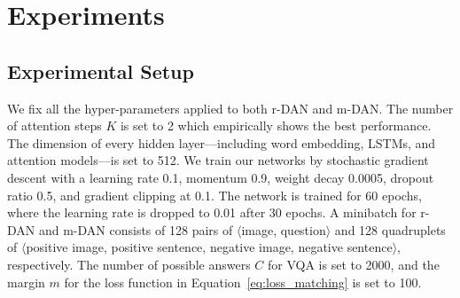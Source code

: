 \documentclass[10pt,twocolumn,letterpaper]{article}
\begin{document}
\section{Experiments}


\subsection{Experimental Setup}
We fix all the hyper-parameters applied to both r-DAN and m-DAN.
The number of attention steps $K$ is set to 2 which empirically shows the best performance.
The dimension of every hidden layer---including word embedding, LSTMs, and attention models---is set to 512.
We train our networks by stochastic gradient descent with a learning rate 0.1, momentum 0.9, weight decay 0.0005, dropout ratio 0.5, and gradient clipping at 0.1.
The network is trained for 60 epochs, where the learning rate is dropped to 0.01 after 30 epochs.
A minibatch for r-DAN and m-DAN consists of 128 pairs of $\langle$image, question$\rangle$ and 128 quadruplets of $\langle$positive image, positive sentence, negative image, negative sentence$\rangle$, respectively.
The number of possible answers $C$ for VQA is set to 2000, and the margin $m$ for the loss function in Equation~\ref{eq:loss_matching} is set to 100.
\end{document}
